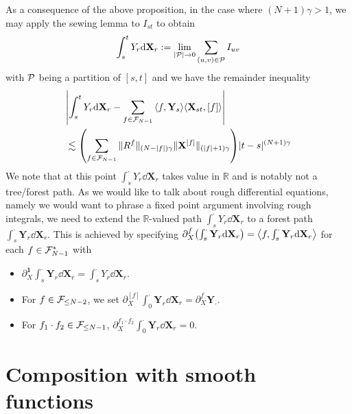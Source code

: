 \documentclass[a4paper, 10pt]{style/preprint}
\begin{document}
As a consequence of the above proposition, in the case where \((N + 1) \gamma > 1\), we may apply the sewing 
lemma to \(I_{st}\) to obtain 
\[\int_s^t Y_r \dd \mathbf{X}_r := \lim_{|{\mathcal P}| \to 0} \sum_{(u, v) \in {\mathcal P}} I_{uv}\]
with \({\mathcal P}\) being a partition of \([s, t]\) and we have the remainder inequality 
\begin{align*}
  & \left|\int_s^t Y_r \dd \mathbf{X}_r - \sum_{f \in \CF_{N - 1}} \< f, \mathbf{Y}_s\> \< \mathbf{X}_{st}, [f]\>\right|\\
  & \lesssim \left(\sum_{f \in \CF_{N - 1}} \|R^f\|_{(N - |f|)\gamma} \|\mathbf{X}^{[f]}\|_{(|f| + 1)\gamma}\right)|t - s|^{(N + 1)\gamma}
\end{align*}
We note that at this point \(\int_s^{\cdot} Y_r \dd \mathbf{X}_r\) takes value in \(\mathbb{R}\) and is notably not a tree/forest 
path. As we would like to talk about rough differential equations, namely we would want to phrase a fixed point 
argument involving rough integrals, we need to extend the \(\mathbb{R}\)-valued path \(\int_s^{\cdot} Y_r \dd \mathbf{X}_r\) 
to a forest path \(\int_s^{\cdot} \mathbf{Y}_r \dd \mathbf{X}_r\). This is achieved by specifying 
\(\partial^f_X \left(\int_s^{\cdot} \mathbf{Y}_r \dd \mathbf{X}_r\right) = \< f, \int_s^{\cdot} \mathbf{Y}_r \dd \mathbf{X}_r \>\) 
for each \(f \in {\mathcal F}_{N - 1}^*\) with 
\begin{itemize}
  \item \(\partial^{\mathbf{1}}_X \int_s^{\cdot} \mathbf{Y}_r \dd \mathbf{X}_r = \int_s^{\cdot} Y_r \dd \mathbf{X}_r\).
  \item For \(f \in {\mathcal F}_{\le N - 2}\), we set \(\partial^{[f]}_X \int_0^{\cdot} \mathbf{Y}_r \dd \mathbf{X}_r 
    = \partial^f_X \mathbf{Y}_{\cdot}\).
    \item For \(f_1 \cdot f_2 \in {\mathcal F}_{\le N - 1}\), \(\partial^{f_1 \cdot f_2}_X \int_0^{\cdot} \mathbf{Y}_r \dd \mathbf{X}_r = 0\).
\end{itemize}

\section{Composition with smooth functions}
\end{document}
